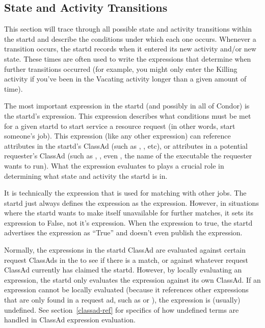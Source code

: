 \subsection{ State and Activity Transitions}
\label{sec:State-and-Activity-Transitions}

This section will trace through all possible state and activity
transitions within the startd and describe the conditions under which
each one occurs.  Whenever a transition occurs, the startd records
when it entered its new activity and/or new state.  These times are
often used to write the expressions that determine when further
transitions occurred (for example, you might only enter the Killing
activity if you've been in the Vacating activity longer than a given
amount of time).

The most important expression in the startd (and possibly in all of
Condor) is the startd's  expression.  This expression
describes what conditions must be met for a given startd to start
service a resource request (in other words, start someone's job).
This expression (like any other expression) can reference attributes
in the startd's ClassAd (such as , ,
etc), or attributes in a potential requester's ClassAd (such as
, , even , the name of the
executable the requester wants to run).  What the 
expression evaluates to plays a crucial role in determining what state
and activity the startd is in.

It is technically the  expression that is used for
matching with other jobs.  The startd just always defines the
 expression as the  expression.
However, in situations where the startd wants to make itself
unavailable for further matches, it sets its 
expression to False, not it's  expression.  When the
 expression  to true, the startd
advertises the  expression as ``True'' and doesn't
even publish the  expression.

Normally, the expressions in the startd ClassAd are evaluated against
certain request ClassAds in the  to see if there is
a match, or against whatever request ClassAd currently has claimed the
startd.  However, by locally evaluating an expression, the startd only
evaluates the expression against its own ClassAd.  If an expression
cannot be locally evaluated (because it references other expressions
that are only found in a request ad, such as  or
), the expression is (usually) undefined.  See 
section~\ref{classad-ref} for specifics of how undefined terms are handled 
in ClassAd expression evaluation.

